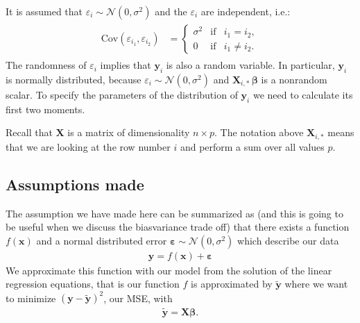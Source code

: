 \documentclass[letterpaper,10pt,english]{sphinxmanual}
\begin{document}
It is assumed that \(\varepsilon_i
\sim \mathcal{N}(0, \sigma^2)\) and the \(\varepsilon_{i}\) are
independent, i.e.:
\begin{equation*}
\begin{split}
\begin{align*} 
\mbox{Cov}(\varepsilon_{i_1},
\varepsilon_{i_2}) & = \left\{ \begin{array}{lcc} \sigma^2 & \mbox{if}
& i_1 = i_2, \\ 0 & \mbox{if} & i_1 \not= i_2.  \end{array} \right.
\end{align*}
\end{split}
\end{equation*}
The randomness of \(\varepsilon_i\) implies that
\(\mathbf{y}_i\) is also a random variable. In particular,
\(\mathbf{y}_i\) is normally distributed, because \(\varepsilon_i \sim
\mathcal{N}(0, \sigma^2)\) and \(\mathbf{X}_{i,\ast} \, \boldsymbol{\beta}\) is a
non\sphinxhyphen{}random scalar. To specify the parameters of the distribution of
\(\mathbf{y}_i\) we need to calculate its first two moments.

Recall that \(\boldsymbol{X}\) is a matrix of dimensionality \(n\times p\). The
notation above \(\mathbf{X}_{i,\ast}\) means that we are looking at the
row number \(i\) and perform a sum over all values \(p\).


\subsection{Assumptions made}
\label{\detokenize{chapter4:assumptions-made}}
The assumption we have made here can be summarized as (and this is going to be useful when we discuss the bias\sphinxhyphen{}variance trade off)
that there exists a function \(f(\boldsymbol{x})\) and  a normal distributed error \(\boldsymbol{\varepsilon}\sim \mathcal{N}(0, \sigma^2)\)
which describe our data
\begin{equation*}
\begin{split}
\boldsymbol{y} = f(\boldsymbol{x})+\boldsymbol{\varepsilon}
\end{split}
\end{equation*}
We approximate this function with our model from the solution of the linear regression equations, that is our
function \(f\) is approximated by \(\boldsymbol{\tilde{y}}\) where we want to minimize \((\boldsymbol{y}-\boldsymbol{\tilde{y}})^2\), our MSE, with
\begin{equation*}
\begin{split}
\boldsymbol{\tilde{y}} = \boldsymbol{X}\boldsymbol{\beta}.
\end{split}
\end{equation*}
\end{document}
